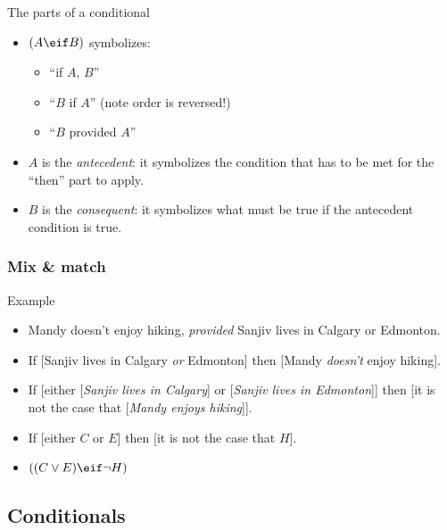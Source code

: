 \begin{frame}{The parts of a conditional}

\begin{itemize}
  \item \emph{$(A \eif B)$} symbolizes:
  \begin{itemize}
    \item ``if $A$, $B$''
    \item ``$B$ if $A$'' (note order is reversed!)
    \item ``$B$ provided $A$''
  \end{itemize}
  \item $A$ is the \emph{antecedent}: it symbolizes the condition that has to
  be met for the ``then'' part to apply.
  \item $B$ is the \emph{consequent}: it symbolizes what must be true
  if the antecedent condition is true.
\end{itemize}
\end{frame}

\begin{frame}
  \frametitle{Mix \& match}

  \begin{block}{Example}
    \begin{itemize}[<+->]
      \item[] Mandy doesn't enjoy hiking, \emph{provided} Sanjiv lives in Calgary or Edmonton.

  \item[] If [Sanjiv lives in Calgary \emph{or} Edmonton] then [Mandy \emph{doesn't} enjoy hiking].

  \item[] If [either [\emph{Sanjiv lives in Calgary}] or [\emph{Sanjiv lives in Edmonton}]]
  then [it is not the case that [\emph{Mandy enjoys hiking}]].

  \item[] If [either $C$ or $E$]
  then [it is not the case that $H$].

  \item[] $((C \lor E) \eif \lnot H)$
  \end{itemize}
  \end{block}

\end{frame}

\subsection{Conditionals}

